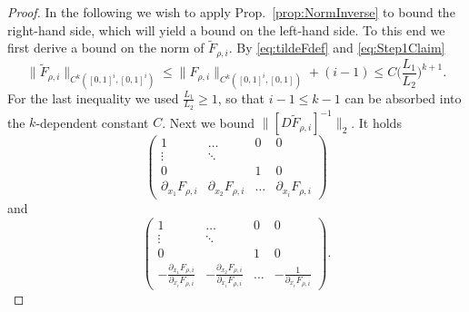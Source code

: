 \begin{proof}
  In the following we wish to apply Prop.~\ref{prop:NormInverse} to
  bound the right-hand side, which will yield a bound on the left-hand
  side.  To this end we first derive a bound on the norm of
  $\tilde F_{\rho,i}$. By \eqref{eq:tildeFdef} and
  \eqref{eq:Step1Claim}
  \begin{equation}\label{eq:tildeFrhobound}
    \|\tilde{F}_{\rho,
      i}\|_{C^k([0,1]^i, [0,1]^i)} \leq \|F_{\rho,i}\|_{C^k([0,1]^i, [0,1])}
    + (i-1)\le C\Big(\frac{L_1}{L_2}\Big)^{k+1}.
  \end{equation}
  For the last inequality we used $\frac{L_1}{L_2}\ge 1$, so that
  $i-1\le k-1$ can be absorbed into the $k$-dependent constant $C$.
  Next we bound $\|[D\tilde{F}_{\rho, i}]^{-1}\|_2$.  It holds
  \begin{equation*}
    \begin{pmatrix} 
      1 &  \dots & 0  & 0\\
      \vdots & \ddots &  &\\
      0 &        & 1 & 0\\
      \partial_{x_1}F_{\rho, i}&\partial_{x_2}F_{\rho, i}&\dots &
      \partial_{x_i}F_{\rho, i}
    \end{pmatrix}
  \end{equation*}
  and
  \begin{equation*}
    \begin{pmatrix} 
      1 &  \dots & 0  & 0\\
      \vdots & \ddots &  &\\
      0 &        & 1 & 0\\
      -\frac{\partial_{x_1}F_{\rho, i}}{\partial_{x_i}F_{\rho,
          i}}&-\frac{\partial_{x_2}F_{\rho, i}}{\partial_{x_i}F_{\rho,
          i}}&\dots & -\frac{1}{\partial_{x_i}F_{\rho, i}}
    \end{pmatrix}.
  \end{equation*}
    

\end{proof}
